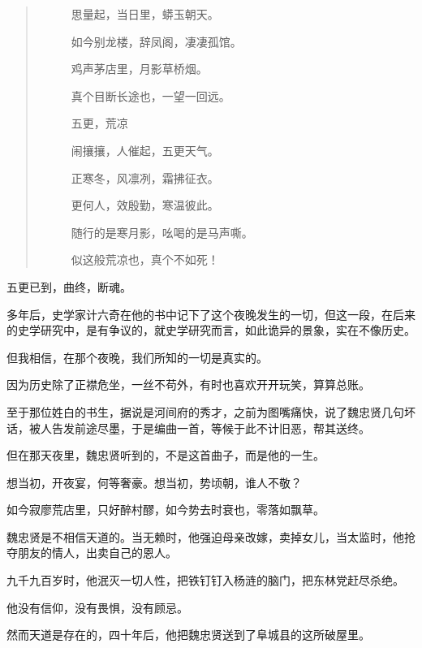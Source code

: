 \begin{multicols}{\theparacolNo}
\begin{quote}
\begin{spacing}{0.5}
{{\begin{description}
					\item[\textcolor{Gray}{\faQuoteRight}] 思量起，当日里，蟒玉朝天。
					\item[\textcolor{Gray}{\faQuoteRight}] 如今别龙楼，辞凤阁，凄凄孤馆。
					\item[\textcolor{Gray}{\faQuoteRight}] 鸡声茅店里，月影草桥烟。
					\item[\textcolor{Gray}{\faQuoteRight}] 真个目断长途也，一望一回远。
					\item[\textcolor{Gray}{\faQuoteRight}] 五更，荒凉
					\item[\textcolor{Gray}{\faQuoteRight}] 闹攘攘，人催起，五更天气。
					\item[\textcolor{Gray}{\faQuoteRight}] 正寒冬，风凛冽，霜拂征衣。
					\item[\textcolor{Gray}{\faQuoteRight}] 更何人，效殷勤，寒温彼此。
					\item[\textcolor{Gray}{\faQuoteRight}] 随行的是寒月影，吆喝的是马声嘶。
					\item[\textcolor{Gray}{\faQuoteRight}] 似这般荒凉也，真个不如死！
				\end{description}
		}}
	\end{spacing}
\end{quote}

五更已到，曲终，断魂。

多年后，史学家计六奇在他的书中记下了这个夜晚发生的一切，但这一段，在后来的史学研究中，是有争议的，就史学研究而言，如此诡异的景象，实在不像历史。

但我相信，在那个夜晚，我们所知的一切是真实的。

因为历史除了正襟危坐，一丝不苟外，有时也喜欢开开玩笑，算算总账。

至于那位姓白的书生，据说是河间府的秀才，之前为图嘴痛快，说了魏忠贤几句坏话，被人告发前途尽墨，于是编曲一首，等候于此不计旧恶，帮其送终。

但在那天夜里，魏忠贤听到的，不是这首曲子，而是他的一生。

想当初，开夜宴，何等奢豪。想当初，势顷朝，谁人不敬？

如今寂廖荒店里，只好醉村醪，如今势去时衰也，零落如飘草。

魏忠贤是不相信天道的。当无赖时，他强迫母亲改嫁，卖掉女儿，当太监时，他抢夺朋友的情人，出卖自己的恩人。

九千九百岁时，他泯灭一切人性，把铁钉钉入杨涟的脑门，把东林党赶尽杀绝。

他没有信仰，没有畏惧，没有顾忌。

然而天道是存在的，四十年后，他把魏忠贤送到了阜城县的这所破屋里。


\end{multicols}
